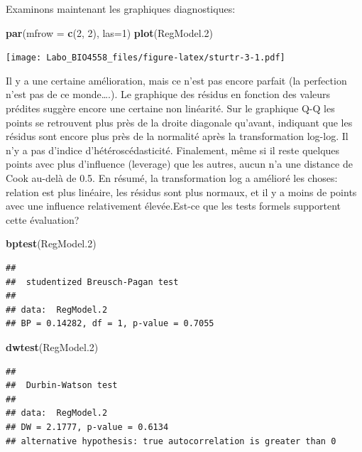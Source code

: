 \documentclass[12pt,]{book}
\newenvironment{Shaded}{\begin{snugshade}}{\end{snugshade}}
\newcommand{\DataTypeTok}[1]{\textcolor[rgb]{0.13,0.29,0.53}{#1}}
\newcommand{\DecValTok}[1]{\textcolor[rgb]{0.00,0.00,0.81}{#1}}
\newcommand{\FloatTok}[1]{\textcolor[rgb]{0.00,0.00,0.81}{#1}}
\newcommand{\KeywordTok}[1]{\textcolor[rgb]{0.13,0.29,0.53}{\textbf{#1}}}
\newcommand{\NormalTok}[1]{#1}
\begin{document}
Examinons maintenant les graphiques diagnostiques:

\begin{Shaded}
\begin{Highlighting}[]
\KeywordTok{par}\NormalTok{(}\DataTypeTok{mfrow =} \KeywordTok{c}\NormalTok{(}\DecValTok{2}\NormalTok{, }\DecValTok{2}\NormalTok{), }\DataTypeTok{las=}\DecValTok{1}\NormalTok{)}
\KeywordTok{plot}\NormalTok{(RegModel}\FloatTok{.2}\NormalTok{)}
\end{Highlighting}
\end{Shaded}

\texttt{[image: Labo\_BIO4558\_files/figure-latex/sturtr-3-1.pdf]}

Il y a une certaine amélioration, mais ce n'est pas encore parfait (la perfection n'est pas de ce monde\ldots{}.). Le graphique des résidus en fonction des valeurs prédites suggère encore une certaine non linéarité. Sur le graphique Q-Q les points se retrouvent plus près de la droite diagonale qu'avant, indiquant que les résidus sont encore plus près de la normalité après la transformation log-log. Il n'y a pas d'indice d'hétéroscédasticité. Finalement, même si il reste quelques points avec plus d'influence (leverage) que les autres, aucun n'a une distance de Cook au-delà de 0.5. En résumé, la transformation log a amélioré les choses: relation est plus linéaire, les résidus sont plus normaux, et il y a moins de points avec une influence relativement élevée.Est-ce que les tests formels supportent cette évaluation?

\begin{Shaded}
\begin{Highlighting}[]
\KeywordTok{bptest}\NormalTok{(RegModel}\FloatTok{.2}\NormalTok{)}
\end{Highlighting}
\end{Shaded}

\begin{verbatim}
## 
##  studentized Breusch-Pagan test
## 
## data:  RegModel.2
## BP = 0.14282, df = 1, p-value = 0.7055
\end{verbatim}

\begin{Shaded}
\begin{Highlighting}[]
\KeywordTok{dwtest}\NormalTok{(RegModel}\FloatTok{.2}\NormalTok{)}
\end{Highlighting}
\end{Shaded}

\begin{verbatim}
## 
##  Durbin-Watson test
## 
## data:  RegModel.2
## DW = 2.1777, p-value = 0.6134
## alternative hypothesis: true autocorrelation is greater than 0
\end{verbatim}
\end{document}
